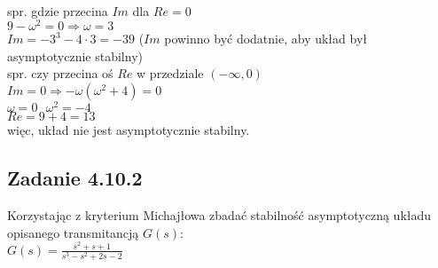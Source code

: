 \noindent\\
spr. gdzie przecina $Im$ dla $Re=0$\\
$9-\omega^2=0\Rightarrow\omega=3$\\
$Im=-3^3-4\cdot 3=-39$ {\color{lightgray} ($Im$ powinno być dodatnie, aby układ był asymptotycznie stabilny)}\\
spr. czy przecina oś $Re$ w przedziale $(-\infty, 0)$\\
$Im=0\Rightarrow -\omega(\omega^2+4)=0$\\
$\omega=0 \ \ \ \omega^2=-4$\\
$Re=9+4=13$\\
więc, układ nie jest asymptotycznie stabilny.

\pagebreak
\subsection*{Zadanie 4.10.2} {\color{darkgray}
	Korzystając z kryterium Michajłowa zbadać stabilność asymptotyczną układu opisanego transmitancją $G(s)$:\\
	$G(s)=\frac{s^2+s+1}{s^3-s^2+2s-2}$\\
}\lineh
\\\\

